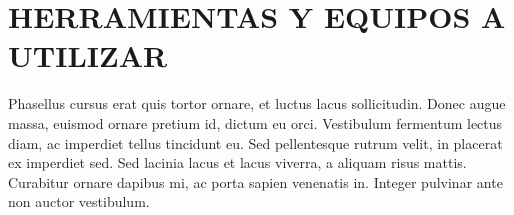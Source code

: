 \documentclass[stu, 12pt, helv, letterpaper, donotrepeattitle, floatsintext, natbib]{apa7}
\begin{document}
\section*{HERRAMIENTAS Y EQUIPOS A UTILIZAR }

Phasellus cursus erat quis tortor ornare, et luctus lacus sollicitudin. Donec augue massa, euismod ornare pretium id, dictum eu orci. Vestibulum fermentum lectus diam, ac imperdiet tellus tincidunt eu. Sed pellentesque rutrum velit, in placerat ex imperdiet sed. Sed lacinia lacus et lacus viverra, a aliquam risus mattis. Curabitur ornare dapibus mi, ac porta sapien venenatis in. Integer pulvinar ante non auctor vestibulum.

\renewcommand\refname{\large\textbf{Referencias}}


\noindent {}\\
\end{document}
